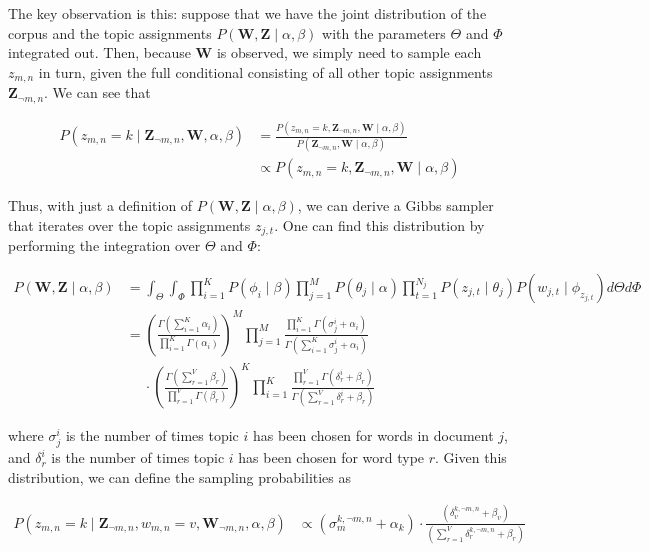 \documentclass[11pt]{article}
\begin{document}
The key observation is this: suppose that we have the joint distribution of
the corpus and the topic assignments $P(\mathbf{W}, \mathbf{Z} \mid \alpha,
\beta)$ with the parameters $\Theta$ and $\Phi$ integrated out. Then,
because $\mathbf{W}$ is observed, we simply need to sample each $z_{m,n}$
in turn, given the full conditional consisting of all other topic
assignments $\mathbf{Z}_{\neg m,n}$. We can see that

\begin{align}
  P(z_{m,n} = k \mid \mathbf{Z}_{\neg m,n}, \mathbf{W}, \alpha, \beta)
  &=
  \frac{P(z_{m,n} = k, \mathbf{Z}_{\neg m,n}, \mathbf{W} \mid \alpha, \beta)}
  {P(\mathbf{Z}_{\neg m,n}, \mathbf{W} \mid \alpha, \beta)}\nonumber\\
  & \propto P(z_{m,n} = k, \mathbf{Z}_{\neg m,n}, \mathbf{W} \mid \alpha,
    \beta)
\end{align}

Thus, with just a definition of $P(\mathbf{W}, \mathbf{Z} \mid \alpha,
\beta)$, we can derive a Gibbs sampler that iterates over the topic
assignments $z_{j,t}$. One can find this distribution by performing the
integration over $\Theta$ and $\Phi$:

\begin{align}
  P(\mathbf{W}, \mathbf{Z} \mid \alpha, \beta)
  &= \int_\Theta
     \int_\Phi
     \prod_{i=1}^K P(\phi_i \mid \beta)
     \prod_{j=1}^M P(\theta_j \mid \alpha)
     \prod_{t=1}^{N_j} P(z_{j,t} \mid \theta_j)
     P(w_{j,t} \mid \phi_{z_{j,t}}) d\Theta d\Phi\nonumber\\
  &= \left(
       \frac{\Gamma(\sum_{i=1}^K \alpha_i)}
       {\prod_{i=1}^K \Gamma(\alpha_i)}
     \right)^M
     \prod_{j=1}^M
     \frac{\prod_{i=1}^K \Gamma(\sigma_j^i + \alpha_i)}
     {\Gamma(\sum_{i=1}^K\sigma_j^i + \alpha_i)}\nonumber\\
     &\quad\;\cdot
     \left(
       \frac{\Gamma(\sum_{r=1}^V \beta_r)}
       {\prod_{r=1}^V \Gamma(\beta_r)}
     \right)^K
     \prod_{i=1}^K
     \frac{\prod_{r=1}^V \Gamma(\delta_r^i + \beta_r)}
     {\Gamma(\sum_{r=1}^V \delta_r^i + \beta_r)}
\end{align}

where $\sigma_j^i$ is the number of times topic $i$ has been chosen for
words in document $j$, and $\delta_r^i$ is the number of times topic $i$
has been chosen for word type $r$. Given this distribution, we can define
the sampling probabilities as

\begin{align}
  P(z_{m,n} = k \mid \mathbf{Z}_{\neg m,n}, w_{m,n} = v, \mathbf{W}_{\neg
  m,n}, \alpha, \beta)
  &\propto
  (\sigma_m^{k, \neg m,n} + \alpha_k)
  \cdot
  \frac{\left(\delta_v^{k,\neg m,n} + \beta_v\right)}
  {\left(\sum_{r=1}^V \delta_r^{k,\neg m,n} + \beta_r\right)}
  \label{eqn:cgs}
\end{align}
\end{document}
